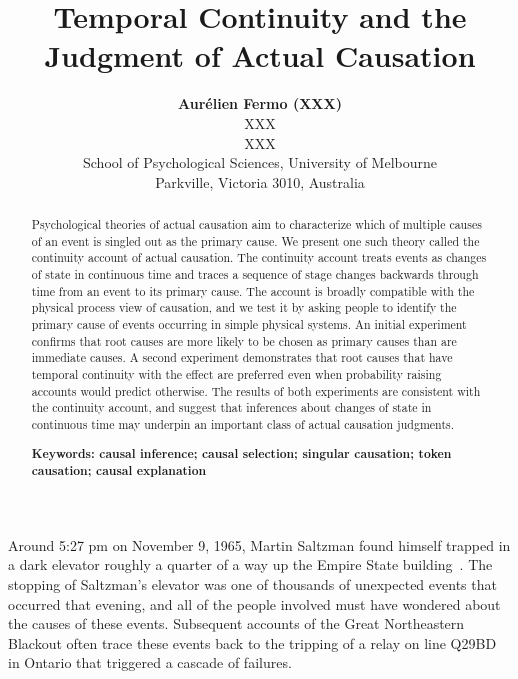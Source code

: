 \documentclass[10pt,letterpaper]{article}
\title{Temporal Continuity and the Judgment of Actual Causation}
\author{{\large \bf Aur\'{e}lien Fermo (XXX)} \\
  XXX \\
  XXX 
  \AND {\large \bf Charles Kemp (c.kemp@unimelb.edu.au)} \\
  School of Psychological Sciences, University of Melbourne\\
  Parkville, Victoria 3010, Australia}
\begin{document}
\maketitle


\begin{abstract}

Psychological theories of actual causation aim to characterize which of multiple causes of an event is singled out as the primary cause. We present one such theory called the continuity account of actual causation. The continuity account treats events as changes of state in continuous time and traces a sequence of stage changes backwards through time from an event to its primary cause. The account is broadly compatible with the physical process view of causation, and we test it by asking people to identify the primary cause of events occurring in simple physical systems. An initial experiment confirms that root causes are more likely to be chosen as primary causes than are immediate causes. A second experiment demonstrates that root causes that have temporal continuity with the effect are preferred even when probability raising accounts would predict otherwise. The results of both experiments are consistent with the continuity account, and suggest that inferences about changes of state in continuous time may underpin an important class of actual causation judgments.  

\textbf{Keywords: causal inference; causal selection; singular causation; token causation; causal explanation} 
\end{abstract}


Around 5:27 pm on November 9, 1965, Martin Saltzman found himself trapped in a dark elevator roughly a quarter of a way up the Empire State building~\cite{gelbr1965night}. The stopping of Saltzman's elevator was one of thousands of unexpected events that occurred that evening, and all of the people involved must have wondered about the causes of these events. Subsequent accounts of the Great Northeastern Blackout often trace these events back to the tripping of a relay on line Q29BD in Ontario that triggered a cascade of failures.
\end{document}

